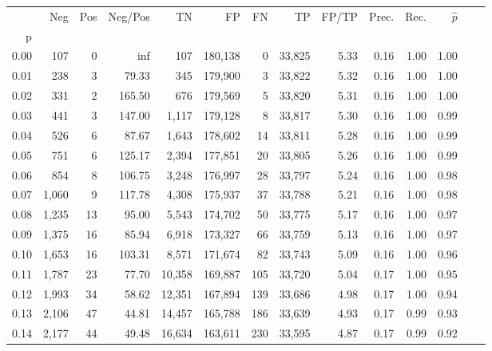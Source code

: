\begin{tabular}{rrrrrrrrrrrrrr}
\toprule
{} &    Neg &  Pos & Neg/Pos &       TN &       FP &      FN &      TP & FP/TP & Prec. &  Rec. & $\hat{p}$ \\
p    &        &      &         &          &          &         &         &       &       &       &           \\
\midrule
0.00 &    107 &    0 &     inf &      107 &  180,138 &       0 &  33,825 &  5.33 &  0.16 &  1.00 &      1.00 \\
0.01 &    238 &    3 &   79.33 &      345 &  179,900 &       3 &  33,822 &  5.32 &  0.16 &  1.00 &      1.00 \\
0.02 &    331 &    2 &  165.50 &      676 &  179,569 &       5 &  33,820 &  5.31 &  0.16 &  1.00 &      1.00 \\
0.03 &    441 &    3 &  147.00 &    1,117 &  179,128 &       8 &  33,817 &  5.30 &  0.16 &  1.00 &      0.99 \\
0.04 &    526 &    6 &   87.67 &    1,643 &  178,602 &      14 &  33,811 &  5.28 &  0.16 &  1.00 &      0.99 \\
0.05 &    751 &    6 &  125.17 &    2,394 &  177,851 &      20 &  33,805 &  5.26 &  0.16 &  1.00 &      0.99 \\
0.06 &    854 &    8 &  106.75 &    3,248 &  176,997 &      28 &  33,797 &  5.24 &  0.16 &  1.00 &      0.98 \\
0.07 &  1,060 &    9 &  117.78 &    4,308 &  175,937 &      37 &  33,788 &  5.21 &  0.16 &  1.00 &      0.98 \\
0.08 &  1,235 &   13 &   95.00 &    5,543 &  174,702 &      50 &  33,775 &  5.17 &  0.16 &  1.00 &      0.97 \\
0.09 &  1,375 &   16 &   85.94 &    6,918 &  173,327 &      66 &  33,759 &  5.13 &  0.16 &  1.00 &      0.97 \\
0.10 &  1,653 &   16 &  103.31 &    8,571 &  171,674 &      82 &  33,743 &  5.09 &  0.16 &  1.00 &      0.96 \\
0.11 &  1,787 &   23 &   77.70 &   10,358 &  169,887 &     105 &  33,720 &  5.04 &  0.17 &  1.00 &      0.95 \\
0.12 &  1,993 &   34 &   58.62 &   12,351 &  167,894 &     139 &  33,686 &  4.98 &  0.17 &  1.00 &      0.94 \\
0.13 &  2,106 &   47 &   44.81 &   14,457 &  165,788 &     186 &  33,639 &  4.93 &  0.17 &  0.99 &      0.93 \\
0.14 &  2,177 &   44 &   49.48 &   16,634 &  163,611 &     230 &  33,595 &  4.87 &  0.17 &  0.99 &      0.92 \\

\end{tabular}

